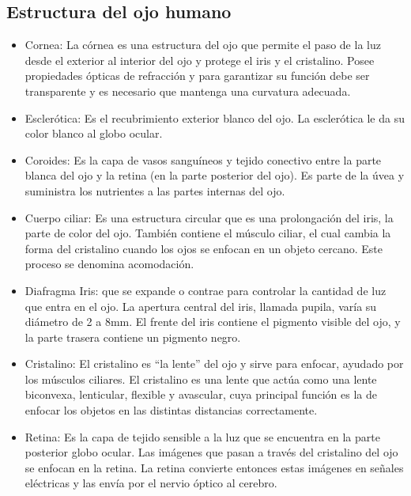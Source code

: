 \subsection{Estructura del ojo humano}
\begin{itemize}
\item Cornea: La córnea es una estructura del ojo que permite el paso de la luz desde el exterior al interior del ojo y protege el iris y el cristalino. Posee propiedades ópticas de refracción y para garantizar su función debe ser transparente y es necesario que mantenga una curvatura adecuada.
\item Esclerótica: Es el recubrimiento exterior blanco del ojo. La esclerótica le da su color blanco al globo ocular.
\item Coroides: Es la capa de vasos sanguíneos y tejido conectivo entre la parte blanca del ojo y la retina (en la parte posterior del ojo). Es parte de la úvea y suministra los nutrientes a las partes internas del ojo.
\item Cuerpo ciliar: Es una estructura circular que es una prolongación del iris, la parte de color del ojo. También contiene el músculo ciliar, el cual cambia la forma del cristalino cuando los ojos se enfocan en un objeto cercano. Este proceso se denomina acomodación.
\item Diafragma Iris: que se expande o contrae para controlar la cantidad de luz que entra en el ojo. La apertura central del iris, llamada pupila, varía su diámetro de 2 a 8mm. El frente del iris contiene el pigmento visible del ojo, y la parte trasera contiene un pigmento negro.
\item Cristalino: El cristalino es “la lente” del ojo y sirve para enfocar, ayudado por los músculos ciliares. El cristalino es una lente que actúa como una lente biconvexa, lenticular, flexible y avascular, cuya principal función es la de enfocar los objetos en las distintas distancias correctamente.
\item Retina: Es la capa de tejido sensible a la luz que se encuentra en la parte posterior globo ocular. Las imágenes que pasan a través del cristalino del ojo se enfocan en la retina. La retina convierte entonces estas imágenes en señales eléctricas y las envía por el nervio óptico al cerebro.
\end{itemize}
